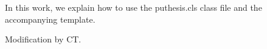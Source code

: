 In this work, we explain how to use the puthesis.cls class file and the accompanying template.  



Modification by CT.